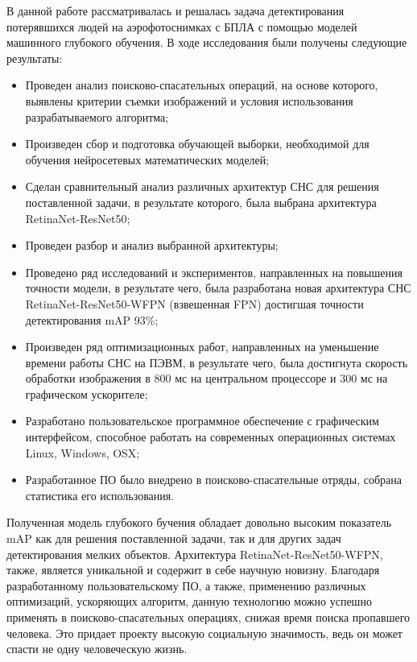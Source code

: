 
В данной работе рассматривалась и решалась задача детектирования потерявшихся людей на аэрофотоснимках с БПЛА с помощью моделей машинного глубокого обучения. В ходе исследования были получены следующие результаты:
\begin{itemize}
    \item Проведен анализ поисково-спасательных операций, на основе которого, выявлены критерии съемки изображений и условия использования разрабатываемого алгоритма;
    \item Произведен сбор и подготовка обучающей выборки, необходимой для обучения нейросетевых математических моделей;
    \item Сделан сравнительный анализ различных архитектур СНС для решения поставленной задачи, в результате которого, была выбрана архитектура RetinaNet-ResNet50;
    \item Проведен разбор и анализ выбранной архитектуры;
    \item Проведено ряд исследований и экспериментов, направленных на повышения точности модели, в результате чего, была разработана новая архитектура СНС RetinaNet-ResNet50-WFPN (взвешенная FPN) достигшая точности детектирования mAP 93\%;
    \item Произведен ряд оптимизационных работ, направленных на уменьшение времени работы СНС на ПЭВМ, в результате чего, была достигнута скорость обработки изображения в 800 мс на центральном процессоре и 300 мс на графическом ускорителе;
    \item Разработано пользовательское программное обеспечение с графическим интерфейсом, способное работать на современных операционных системах Linux, Windows, OSX;
    \item Разработанное ПО было внедрено в поисково-спасательные отряды, собрана статистика его использования. 
\end{itemize}

Полученная модель глубокого бучения обладает довольно высоким показатель mAP как для решения поставленной задачи, так и для других задач детектирования мелких объектов. Архитектура RetinaNet-ResNet50-WFPN, также, является уникальной и содержит в себе научную новизну. Благодаря разработанному пользовательскому ПО, а также, применению различных оптимизаций, ускоряющих алгоритм, данную технологию можно успешно применять в поисково-спасательных операциях, снижая время поиска пропавшего человека. Это придает проекту высокую социальную значимость, ведь он может спасти не одну человеческую жизнь.

\clearpage